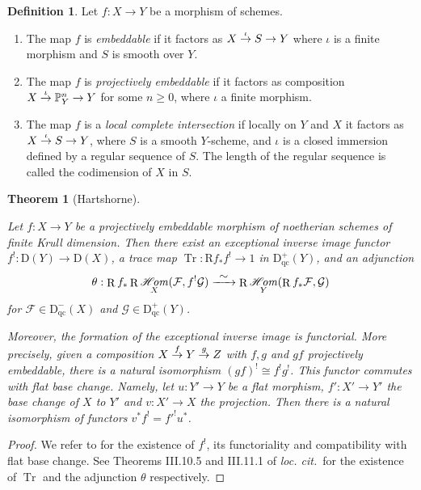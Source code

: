 \documentclass[11pt]{article}
\providecommand{\loccit}{\emph{loc. cit.}}
\newcommand\To[1]{\mathchoice{\xrightarrow{\textstyle\kern4pt#1\kern3pt}}{\stackrel{#1}{\to}}{}{}}
\newcommand{\qc}{\mathrm{qc}}
\numberwithin{equation}{section}
\newtheorem{theo}[prop]{Theorem}
\theoremstyle{definition}
\newtheorem{definition}[prop]{Definition}
\newcommand{\bb}[1]{\mathbb{#1}}
\newcommand{\n}[1]{\mathcal{#1}}
\newcommand{\s}[1]{\mathscr{#1}}
\DeclareMathOperator{\Tr}{Tr}
\DeclareMathOperator{\R}{R}
\DeclareMathOperator{\sHom}{\s{H}\!\mathit{om}}
\begin{document}
\begin{definition}
Let $f:X\to Y$ be a morphism of schemes.
\begin{enumerate}
\item The map $f$ is \textit{embeddable} if it factors as $X\To{\iota} S \to Y $ where $\iota$ is a finite morphism and $S$ is smooth over $Y$.
\item The map $f$ is \textit{projectively embeddable} if it factors as composition \hbox{$ X\To{\iota} \bb{P}^n_Y\to Y$} for some $n\geq 0$, where $\iota$ a finite morphism.

\item The map $f$ is a \textit{local complete intersection} if locally on $Y$ and $X$ it factors as $X\To{\iota} S \to Y $, where $S$ is a smooth $Y$-scheme, and $\iota$ is a closed immersion defined by a regular sequence of $S$. The length of the regular sequence is called the codimension of $X$ in $S$.
\end{enumerate}
\end{definition}

\begin{theo}[Hartshorne]
\label{GrothSerreDuality}

Let $f: X\to Y$ be a projectively embeddable morphism of noetherian schemes of finite Krull dimension. Then there exist an exceptional inverse image functor $f^!: \mathrm{D}(Y)\to \mathrm{D}(X)$, a trace map $\Tr: \mathrm{R}f_*f^!\to 1$ in $\mathrm{D}^+_{\qc}(Y)$, and an adjunction
\[
\theta: \R f_* \R \sHom_{X}(\n{F}, f^! \n{G}) \To{\sim} \R\sHom_Y(\R f_* \n{F}, \n{G})
\]
for $\s{F}\in \mathrm{D}^-_{\qc}(X)$ and $\s{G}\in \mathrm{D}^+_{\qc}(Y)$.

Moreover, the formation of the exceptional inverse image is functorial. More precisely, given a composition $X\To{f} Y \To{g} Z$ with $f,g$ and $gf$ projectively embeddable, there is a natural isomorphism $(gf)^!\cong f^!g^!$. This functor commutes with flat base change. Namely, let $u:Y'\to Y$ be a flat morphism, $f':X'\to Y'$ the base change of $X$ to $Y'$ and $v: X'\to X$ the projection. Then there is a natural isomorphism of functors $v^*f^!={f'}^! u^*$.
\end{theo}

\begin{proof}
We refer to \cite[Th.\,III.8.7]{hartshorne1966residues} for the existence of $f^!$, its functoriality and compatibility with flat base change. See Theorems III.10.5 and III.11.1 of \loccit\ for the existence of $\Tr$ and the adjunction $\theta$ respectively.
\end{proof}
\end{document}
